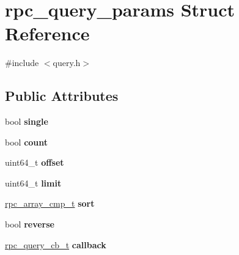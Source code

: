 \hypertarget{structrpc__query__params}{}\section{rpc\+\_\+query\+\_\+params Struct Reference}
\label{structrpc__query__params}


{\ttfamily \#include $<$query.\+h$>$}

\subsection*{Public Attributes}
\begin{DoxyCompactItemize}
\item 
bool {\bfseries single}\hypertarget{structrpc__query__params_a6e4eafac062b7f7490a4983d56296385}{}\label{structrpc__query__params_a6e4eafac062b7f7490a4983d56296385}

\item 
bool {\bfseries count}\hypertarget{structrpc__query__params_a7b488114aeb262c508dd28acc1a7fc95}{}\label{structrpc__query__params_a7b488114aeb262c508dd28acc1a7fc95}

\item 
uint64\+\_\+t {\bfseries offset}\hypertarget{structrpc__query__params_a4e33edf4295472adcc84d6d1ccee2ddd}{}\label{structrpc__query__params_a4e33edf4295472adcc84d6d1ccee2ddd}

\item 
uint64\+\_\+t {\bfseries limit}\hypertarget{structrpc__query__params_a89ee7bc896675c8c2ef148436430ba0a}{}\label{structrpc__query__params_a89ee7bc896675c8c2ef148436430ba0a}

\item 
\hyperlink{object_8h_a37160a10fb9baee827063f3db977315d}{rpc\+\_\+array\+\_\+cmp\+\_\+t} {\bfseries sort}\hypertarget{structrpc__query__params_a661d864b8637b469fd99f3b7392aa507}{}\label{structrpc__query__params_a661d864b8637b469fd99f3b7392aa507}

\item 
bool {\bfseries reverse}\hypertarget{structrpc__query__params_ad50d1e6e25322f5562ec1793647c1618}{}\label{structrpc__query__params_ad50d1e6e25322f5562ec1793647c1618}

\item 
\hyperlink{query_8h_a3dd3753b86199ebdc48d1cb3ab4cf985}{rpc\+\_\+query\+\_\+cb\+\_\+t} {\bfseries callback}\hypertarget{structrpc__query__params_ab8b50541840d07c084797048d22d589a}{}\label{structrpc__query__params_ab8b50541840d07c084797048d22d589a}

\end{DoxyCompactItemize}



